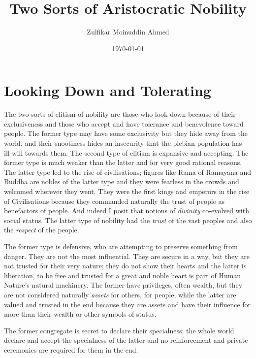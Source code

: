 \documentclass{amsart}
\title{Two Sorts of Aristocratic Nobility}
\author{Zulfikar Moinuddin Ahmed}
\date{\today}
\begin{document}
\maketitle

\section{Looking Down and Tolerating}

The two sorts of elitism of nobility are those who look down because of their exclusiveness and those who accept and have tolerance and benevolence toward people.  The former type may have some exclusivity but they hide away from the world, and their snootiness hides an insecurity that the plebian population has ill-will towards them.  The second type of elitism is expansive and accepting.  The former type is much weaker than the latter and for very good rational reasons.  The latter type led to the rise of civilisations; figures like Rama of Ramayana and Buddha are nobles of the latter type and they were fearless in the crowds and welcomed wherever they went.  They were the first kings and emperors in the rise of Civilisations because they commanded naturally the trust of people as benefactors of people.  And indeed I posit that notions of {\em divinity} co-evolved with social status.  The latter type of nobility had the {\em trust} of the vast peoples and also the {\em respect} of the people.  

The former type is defensive, who are attempting to preserve something from danger.  They are not the most influential.  They are secure in a way, but they are not trusted for their very nature; they do not show their hearts and the latter is liberation, to be free and trusted for a great and noble heart is part of Human Nature's natural machinery.  The former have privileges, often wealth, but they are not considered naturally {\em assets} for others, for people, while the latter are valued and trusted in the end because they are assets and have their influence for more than their wealth or other symbols of status.  

The former congregate is secret to declare their specialness; the whole world declare and accept the specialness of the latter and no reinforcement and private ceremonies are required for them in the end.
\end{document}

